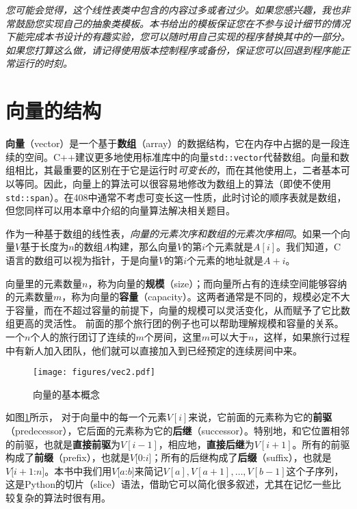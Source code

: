 \textit{您可能会觉得，这个线性表类中包含的内容过多或者过少。如果您感兴趣，我也非常鼓励您实现自己的抽象类模板。本书给出的模板保证您在不参与设计细节的情况下能完成本书设计的有趣实验，您可以随时用自己实现的程序替换其中的一部分。如果您打算这么做，请记得使用版本控制程序或备份，保证您可以回退到程序能正常运行的时刻。}

\section{向量的结构}

\textbf{向量}（vector）是一个基于\textbf{数组}（array）的数据结构，它在内存中占据的是一段连续的空间。C++建议更多地使用标准库中的向量\lstinline{std::vector}代替数组。向量和数组相比，其最重要的区别在于它是运行时\textit{可变长的}，而在其他使用上，二者基本可以等同。因此，向量上的算法可以很容易地修改为数组上的算法（即使不使用\lstinline{std::span}）。在408中通常不考虑可变长这一性质，此时讨论的顺序表就是数组，但您同样可以用本章中介绍的向量算法解决相关题目。

作为一种基于数组的线性表，\textit{向量的元素次序和数组的元素次序相同}。如果一个向量$V$基于长度为$n$的数组$A$构建，那么向量$V$的第$i$个元素就是$A[i]$。我们知道，C语言的数组可以视为指针，于是向量$V$的第$i$个元素的地址就是$A+i$。

向量里的元素数量$n$，称为向量的\textbf{规模}（size）；而向量所占有的连续空间能够容纳的元素数量$m$，称为向量的\textbf{容量}（capacity）。这两者通常是不同的，规模必定不大于容量，而在不超过容量的前提下，向量的规模可以灵活变化，从而赋予了它比数组更高的灵活性。
前面的那个旅行团的例子也可以帮助理解规模和容量的关系。一个$n$个人的旅行团订了连续的$m$个房间，这里$m$可以大于$n$，这样，如果旅行过程中有新人加入团队，他们就可以直接加入到已经预定的连续房间中来。

\begin{figure}
  \centering
  \texttt{[image: figures/vec2.pdf]}
  \caption{向量的基本概念}
  \label{fig:vec2}
\end{figure}

如图\ref{fig:vec2}所示，
对于向量中的每一个元素$V[i]$来说，它前面的元素称为它的\textbf{前驱}（predecessor），它后面的元素称为它的\textbf{后继}（successor）。特别地，和它位置相邻的前驱，也就是\textbf{直接前驱}为$V[i-1]$，相应地，\textbf{直接后继}为$V[i+1]$。所有的前驱构成了\textbf{前缀}（prefix），也就是$V[0$:$i]$；所有的后继构成了\textbf{后缀}（suffix），也就是$V[i+1$:$n]$。本书中我们用$V[a$:$b]$来简记$V[a],V[a+1],\dots,V[b-1]$这个子序列，这是Python的切片（slice）语法，借助它可以简化很多叙述，尤其在记忆一些比较复杂的算法时很有用。

